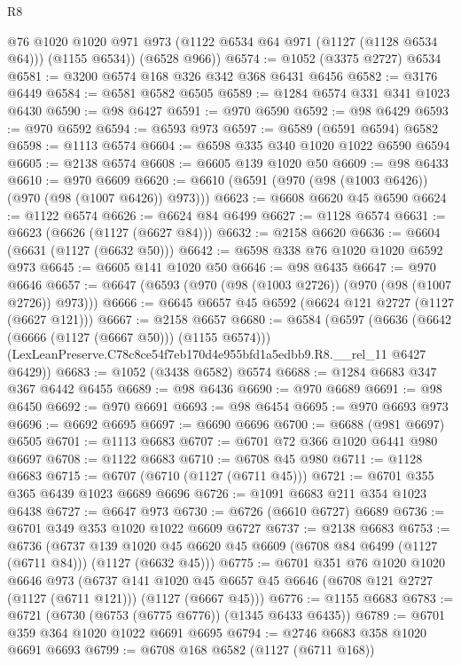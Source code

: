 \begin{lexlean}{R8}
\begin{coremodule}
        @76
        @1020
        @1020
        @971
        @973
        (@1122 @6534 @64 @971 (@1127 (@1128 @6534 @64)))
        (@1155 @6534))
      (@6528 @966))
@6574 := @1052 (@3375 @2727) @6534
@6581 := @3200 @6574 @168 @326 @342 @368 @6431 @6456
@6582 := @3176 @6449
@6584 := @6581 @6582 @6505
@6589 := @1284 @6574 @331 @341 @1023 @6430
@6590 := @98 @6427
@6591 := @970 @6590
@6592 := @98 @6429
@6593 := @970 @6592
@6594 := @6593 @973
@6597 := @6589 (@6591 @6594) @6582
@6598 := @1113 @6574
@6604 := @6598 @335 @340 @1020 @1022 @6590 @6594
@6605 := @2138 @6574
@6608 := @6605 @139 @1020 @50
@6609 := @98 @6433
@6610 := @970 @6609
@6620 := @6610 (@6591 (@970 (@98 (@1003 @6426)) (@970 (@98 (@1007 @6426)) @973)))
@6623 := @6608 @6620 @45 @6590
@6624 := @1122 @6574
@6626 := @6624 @84 @6499
@6627 := @1128 @6574
@6631 := @6623 (@6626 (@1127 (@6627 @84)))
@6632 := @2158 @6620
@6636 := @6604 (@6631 (@1127 (@6632 @50)))
@6642 := @6598 @338 @76 @1020 @1020 @6592 @973
@6645 := @6605 @141 @1020 @50
@6646 := @98 @6435
@6647 := @970 @6646
@6657 := @6647 (@6593 (@970 (@98 (@1003 @2726)) (@970 (@98 (@1007 @2726)) @973)))
@6666 := @6645 @6657 @45 @6592 (@6624 @121 @2727 (@1127 (@6627 @121)))
@6667 := @2158 @6657
@6680 := @6584
    (@6597
      (@6636 (@6642 (@6666 (@1127 (@6667 @50))) (@1155 @6574)))
      (LexLeanPreserve.C78c8ce54f7eb170d4e955bfd1a5edbb9.R8.__rel_11 @6427 @6429))
@6683 := @1052 (@3438 @6582) @6574
@6688 := @1284 @6683 @347 @367 @6442 @6455
@6689 := @98 @6436
@6690 := @970 @6689
@6691 := @98 @6450
@6692 := @970 @6691
@6693 := @98 @6454
@6695 := @970 @6693 @973
@6696 := @6692 @6695
@6697 := @6690 @6696
@6700 := @6688 (@981 @6697) @6505
@6701 := @1113 @6683
@6707 := @6701 @72 @366 @1020 @6441 @980 @6697
@6708 := @1122 @6683
@6710 := @6708 @45 @980
@6711 := @1128 @6683
@6715 := @6707 (@6710 (@1127 (@6711 @45)))
@6721 := @6701 @355 @365 @6439 @1023 @6689 @6696
@6726 := @1091 @6683 @211 @354 @1023 @6438
@6727 := @6647 @973
@6730 := @6726 (@6610 @6727) @6689
@6736 := @6701 @349 @353 @1020 @1022 @6609 @6727
@6737 := @2138 @6683
@6753 := @6736
    (@6737 @139 @1020 @45 @6620 @45 @6609 (@6708 @84 @6499 (@1127 (@6711 @84))) (@1127 (@6632 @45)))
@6775 := @6701
    @351
    @76
    @1020
    @1020
    @6646
    @973
    (@6737
      @141
      @1020
      @45
      @6657
      @45
      @6646
      (@6708 @121 @2727 (@1127 (@6711 @121)))
      (@1127 (@6667 @45)))
@6776 := @1155 @6683
@6783 := @6721 (@6730 (@6753 (@6775 @6776)) (@1345 @6433 @6435))
@6789 := @6701 @359 @364 @1020 @1022 @6691 @6695
@6794 := @2746 @6683 @358 @1020 @6691 @6693
@6799 := @6708 @168 @6582 (@1127 (@6711 @168))

\end{coremodule}
\end{lexlean}
